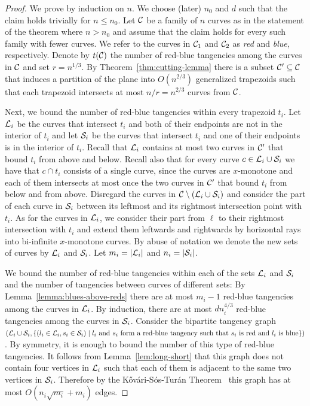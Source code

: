 \documentclass[11pt]{article}
\theoremstyle{definition}
\def\L{{\cal L}}
\def\C{{\cal C}}
\def\S{{\cal S}}
\begin{document}
\begin{proof}
	We prove by induction on $n$. 
	We choose (later) $n_0$ and $d$ such that the claim holds trivially for $n \le n_0$.
	Let $\C$ be a family of $n$ curves as in the statement of the theorem where $n > n_0$ and assume that the claim holds for every such family with fewer curves.
	We refer to the curves in $\C_1$ and $\C_2$ as \emph{red} and \emph{blue}, respectively.
	Denote by $t(\C)$ the number of red-blue tangencies among the curves in $\C$
	and set $r=n^{1/3}$.
	By Theorem~\ref{thm:cutting-lemma} there is a subset $\C' \subseteq \C$ that induces a partition of the plane into $O(n^{2/3})$ generalized trapezoids such that each trapezoid intersects at most $n/r=n^{2/3}$ curves from $\C$.
	
	Next, we bound the number of red-blue tangencies within every trapezoid $t_i$.
	Let $\L_i$ be the curves that intersect $t_i$ and both of their endpoints are not in the interior of $t_i$ and let $\S_i$ be the curves that intersect $t_i$ and one of their endpoints is in the interior of $t_i$.
	Recall that $\L_i$ contains at most two curves in $\C'$ that bound $t_i$ from above and below.
	Recall also that for every curve $c \in \L_i \cup \S_i$ we have that $c \cap t_i$ consists of a single curve, since the curves are $x$-monotone and each of them intersects at most once the two curves in $\C'$ that bound $t_i$ from below and from above.
	Disregard the curves in $\C \setminus (\L_i \cup \S_i)$ and
	consider the part of each curve in $\S_i$ between its leftmost and its rightmost intersection point with $t_i$.
	As for the curves in $\L_i$, we consider their part from $\ell$ to their rightmost intersection with $t_i$ and extend them leftwards and rightwards by horizontal rays into bi-infinite $x$-monotone curves.
	By abuse of notation we denote the new sets of curves by $\L_i$ and $\S_i$.
	Let $m_i = |\L_i|$ and $n_i = |\S_i|$.
	
	We bound the number of red-blue tangencies within each of the sets $\L_i$ and $\S_i$ and the number of tangencies between curves of different sets:
	By Lemma~\ref{lemma:blues-above-reds} there are at most $m_i-1$ red-blue tangencies among the curves in $\L_i$. 
	By induction, there are at most $d n_i^{4/3}$ red-blue tangencies among the curves in $\S_i$. 
	Consider the bipartite tangency graph $(\L_i \cup \S_i, \{(l_i\in\L_i,s_i\in\S_i) \mid \textrm{$l_i$ and $s_i$ form a red-blue tangency such that $s_i$ is red and $l_i$ is blue}\})$.
	By symmetry, it is enough to bound the number of this type of red-blue tangencies.
	It follows from Lemma~\ref{lem:long-short} that this graph does not contain
	four vertices in $\L_i$ such that each of them is adjacent to the same two vertices in $\S_i$. Therefore by the K\H{o}v\'ari-S\'os-Tur\'an Theorem~\cite{Kovari} this graph has at most $O(n_i\sqrt{m_i}+m_i)$ edges.
		

\end{proof}
\end{document}
